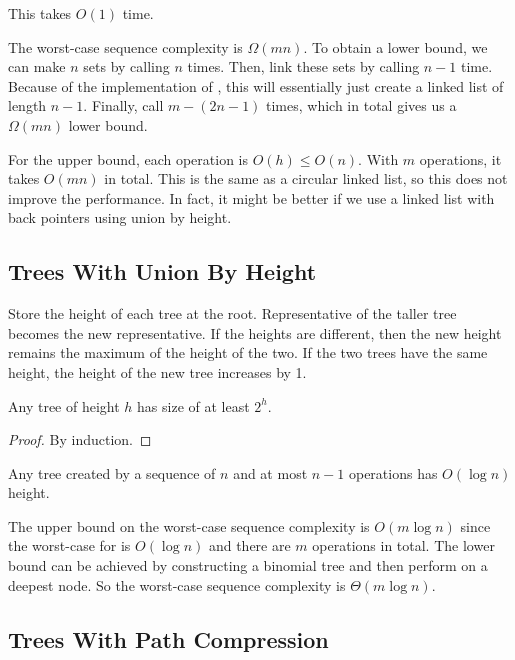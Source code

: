 This takes $O(1)$ time.

The worst-case sequence complexity is $\Omega(mn)$. To obtain a lower bound, we can make $n$ sets by calling  $n$ times. Then, link these sets by calling  $n-1$ time. Because of the implementation of , this will essentially just create a linked list of length $n-1$. Finally, call  $m-(2n-1)$ times, which in total gives us a $\Omega(mn)$ lower bound.

For the upper bound, each operation is $O(h) \leq O(n)$. With $m$ operations, it takes $O(mn)$ in total. This is the same as a circular linked list, so this does not improve the performance. In fact, it might be better if we use a linked list with back pointers using union by height.

\subsection{Trees With Union By Height}

Store the height of each tree at the root. Representative of the taller tree becomes the new representative. If the heights are different, then the new height remains the maximum of the height of the two. If the two trees have the same height, the height of the new tree increases by 1.

\begin{lemma}
    Any tree of height $h$ has size of at least $2^h$.
\end{lemma}

\begin{proof}
    By induction.
\end{proof}

\begin{corollary}
    Any tree created by a sequence of $n$  and at most $n-1$  operations has $O(\log n)$ height.
\end{corollary}

The upper bound on the worst-case sequence complexity is $O(m \log n)$ since the worst-case for  is $O(\log n)$ and there are $m$ operations in total. The lower bound can be achieved by constructing a binomial tree and then perform  on a deepest node. So the worst-case sequence complexity is $\Theta(m \log n)$.

\subsection{Trees With Path Compression}

